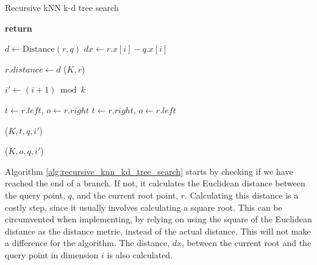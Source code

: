 \begin{algorithm}
\caption{Recursive kNN k-d tree search}
\label{alg:recursive_knn_kd_tree_search}
\begin{algorithmic}
         
            \State \textbf{return}
        \EndIf

        \State $d \gets \text{Distance}(r, q)$
        \State $dx \gets r.x[i] - q.x[i]$

         
            \State $r.distance \gets d$
            \State {}($K, r$)
        \EndIf

        \State $i' \gets (i + 1) \bmod k$ 

          
            \State $t \gets r.left$, $o \gets r.right$
        \Else
            \State $t \gets r.right$, $o \gets r.left$
        \EndIf

        \State {} ($K, t, q, i'$)

         
            \State {}($K, o, q, i'$)
        \EndIf
    \EndProcedure
\end{algorithmic}
\end{algorithm}

Algorithm \ref{alg:recursive_knn_kd_tree_search} starts by checking if we have reached the end of a branch. If not, it calculates the Euclidean distance between the query point, $q$, and the current root point, $r$. Calculating this distance is a costly step, since it usually involves calculating a square root. This can be circumvented when implementing, by relying on using the square of the Euclidean distance as the distance metric, instead of the actual distance. This will not make a difference for the algorithm. The distance, $dx$, between the current root and the query point in dimension $i$ is also calculated.

